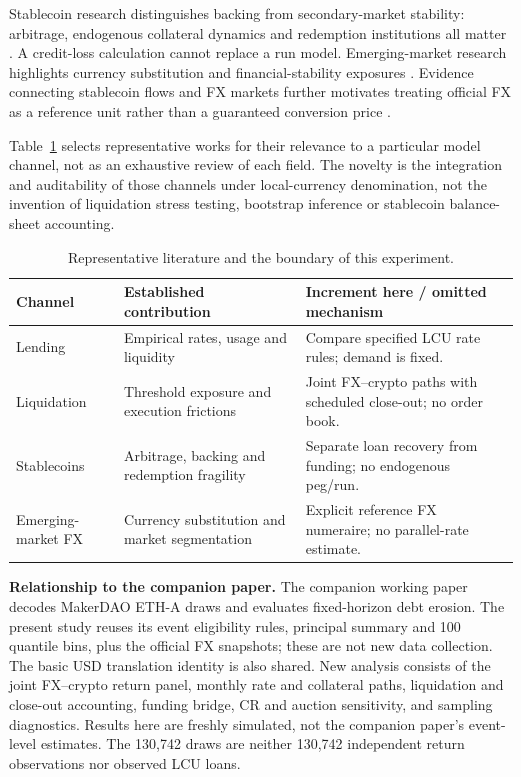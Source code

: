 \documentclass[11pt,a4paper]{article}
\begin{document}
Stablecoin research distinguishes backing from secondary-market stability: arbitrage, endogenous collateral dynamics and redemption institutions all matter \cite{Lyons2023,KlagesMundt2022,GortonZhang2023}. A credit-loss calculation cannot replace a run model. Emerging-market research highlights currency substitution and financial-stability exposures \cite{BIS2023,Copestake2023}. Evidence connecting stablecoin flows and FX markets further motivates treating official FX as a reference unit rather than a guaranteed conversion price \cite{Aldasoro2026}.

Table~\ref{tab:gap} selects representative works for their relevance to a particular model channel, not as an exhaustive review of each field. The novelty is the integration and auditability of those channels under local-currency denomination, not the invention of liquidation stress testing, bootstrap inference or stablecoin balance-sheet accounting.
\begin{table}[H]\centering\small
\caption{Representative literature and the boundary of this experiment.}\label{tab:gap}
\begin{tabularx}{\linewidth}{p{25mm}XX}\toprule
Channel & Established contribution & Increment here / omitted mechanism\\\midrule
Lending \cite{Gudgeon2020Funds,Cornelli2025} & Empirical rates, usage and liquidity & Compare specified LCU rate rules; demand is fixed.\\
Liquidation \cite{Qin2021Liquidations,Perez2021,SasiBrodesky2023} & Threshold exposure and execution frictions & Joint FX--crypto paths with scheduled close-out; no order book.\\
Stablecoins \cite{Lyons2023,KlagesMundt2022,GortonZhang2023} & Arbitrage, backing and redemption fragility & Separate loan recovery from funding; no endogenous peg/run.\\
Emerging-market FX \cite{BIS2023,Copestake2023,Aldasoro2026} & Currency substitution and market segmentation & Explicit reference FX numeraire; no parallel-rate estimate.\\\bottomrule
\end{tabularx}\end{table}

\textbf{Relationship to the companion paper.} The companion working paper \cite{RokniLamouki2026} decodes MakerDAO ETH-A draws and evaluates fixed-horizon debt erosion. The present study reuses its event eligibility rules, principal summary and 100 quantile bins, plus the official FX snapshots; these are not new data collection. The basic USD translation identity is also shared. New analysis consists of the joint FX--crypto return panel, monthly rate and collateral paths, liquidation and close-out accounting, funding bridge, CR and auction sensitivity, and sampling diagnostics. Results here are freshly simulated, not the companion paper's event-level estimates. The 130,742 draws are neither 130,742 independent return observations nor observed LCU loans.
\end{document}
